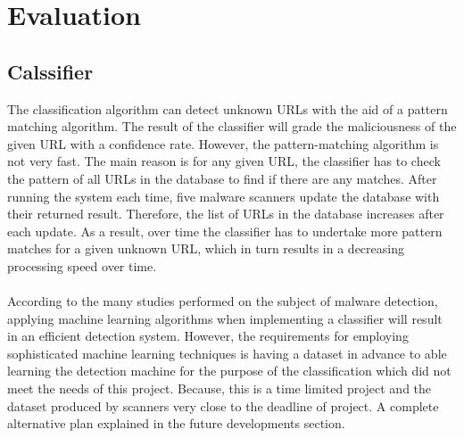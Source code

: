 \section{Evaluation}

\subsection{Calssifier}

The classification algorithm can detect unknown URLs with the aid of a pattern matching algorithm. The result of the classifier will grade the maliciousness of the given URL with a confidence rate. However, the pattern-matching algorithm is not very fast. The main reason is for any given URL, the classifier has to check the pattern of all URLs in the database to find if there are any matches. After running the system each time, five malware scanners update the database with their returned result. Therefore, the list of URLs in the database increases after each update. As a result, over time the classifier has to undertake more pattern matches for a given unknown URL, which in turn results in a decreasing processing speed over time.

\paragraph{} 
According to the many studies performed on the subject of malware detection, applying machine learning algorithms when implementing a classifier will result in an efficient detection system. However, the requirements for employing sophisticated machine learning techniques is having a dataset in advance to able learning the detection machine for the purpose of the classification which did not meet the needs of this project. Because, this is a time limited project and the dataset produced by scanners very close to the deadline of project. A complete alternative plan explained in the future developments section. 